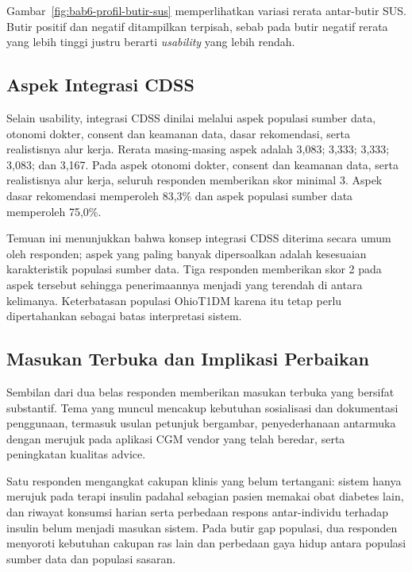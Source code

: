 Gambar~\ref{fig:bab6-profil-butir-sus} memperlihatkan variasi rerata antar-butir SUS. Butir positif dan negatif ditampilkan terpisah, sebab pada butir
negatif rerata yang lebih tinggi justru berarti \textit{usability} yang lebih rendah.

\subsection{Aspek Integrasi CDSS}
\label{subsec:bab6-aspek-integrasi-cdss}

Selain usability, integrasi CDSS dinilai melalui aspek populasi sumber data, otonomi dokter, consent dan keamanan data, dasar rekomendasi, serta
realistisnya alur kerja. Rerata masing-masing aspek adalah 3,083; 3,333; 3,333; 3,083; dan 3,167. Pada aspek otonomi dokter, consent dan keamanan data,
serta realistisnya alur kerja, seluruh responden memberikan skor minimal 3. Aspek dasar rekomendasi memperoleh 83,3\% dan aspek populasi sumber data
memperoleh 75,0\%.

Temuan ini menunjukkan bahwa konsep integrasi CDSS diterima secara umum oleh responden; aspek yang paling banyak dipersoalkan adalah kesesuaian
karakteristik populasi sumber data. Tiga responden memberikan skor 2 pada aspek tersebut sehingga penerimaannya menjadi yang terendah di antara kelimanya. Keterbatasan
populasi OhioT1DM karena itu tetap perlu dipertahankan sebagai batas interpretasi sistem.

\subsection{Masukan Terbuka dan Implikasi Perbaikan}
\label{subsec:bab6-masukan-terbuka-ahli}

Sembilan dari dua belas responden memberikan masukan terbuka yang bersifat substantif. Tema yang muncul mencakup kebutuhan sosialisasi dan dokumentasi
penggunaan, termasuk usulan petunjuk bergambar, penyederhanaan antarmuka dengan merujuk pada aplikasi CGM vendor yang telah beredar, serta peningkatan
kualitas advice.

Satu responden mengangkat cakupan klinis yang belum tertangani: sistem hanya merujuk pada terapi insulin padahal sebagian pasien memakai obat diabetes
lain, dan riwayat konsumsi harian serta perbedaan respons antar-individu terhadap insulin belum menjadi masukan sistem. Pada butir gap
populasi, dua responden menyoroti kebutuhan cakupan ras lain dan perbedaan gaya hidup antara populasi sumber data dan populasi sasaran.

